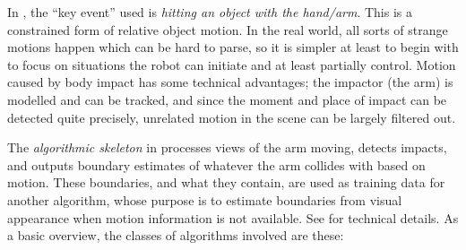 %
%


In , the ``key event'' used is {\em
hitting an object with the hand/arm}.  This is a constrained form of
relative object motion.  In the real world, all sorts of strange
motions happen which can be hard to parse, so it is simpler at least
to begin with to focus on situations the robot can initiate and at
least partially control.
%
%
Motion caused by body impact has some technical advantages; the
impactor (the arm) is modelled and can be tracked, and since the moment 
and place of
impact can be detected quite precisely, unrelated motion in the scene
can be largely filtered out.

The {\em algorithmic skeleton} in \cite{fitzpatrick03grounding}
processes views of the arm moving, detects impacts, and
outputs boundary estimates of whatever the arm collides with based on
motion.  These boundaries, and what they contain, are used as training
data for another algorithm, whose purpose is to estimate boundaries
from visual appearance when motion information is not available.
%
%
See  for technical details.
As a basic overview, the classes of algorithms involved are these:





